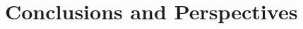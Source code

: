 \documentclass[A4,svgnames,9pt,aspectratio=169]{beamer}
\begin{document}
\section{Conclusions and Perspectives}
\frame{\sectionpage}










\renewcommand{\thankyou}{Thank You.}
\frame{\merci}

\end{document}
